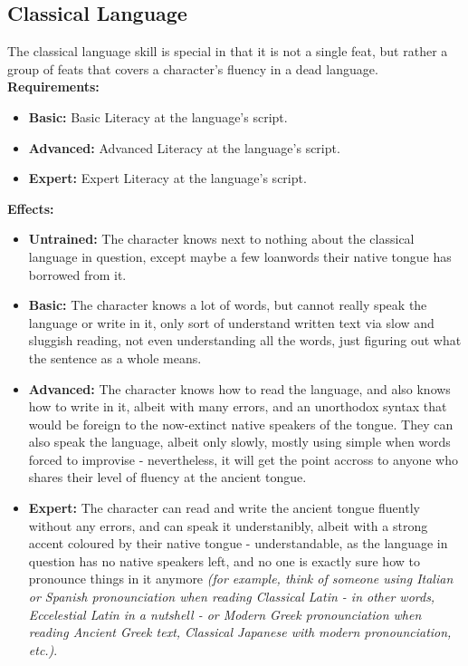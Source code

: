 \documentclass[openany,10pt,a4paper]{book}
\begin{document}
\begin{itemize}
\begin{itemize}
\begin{itemize}
\begin{itemize}
\subsection{Classical Language}
The classical language skill is special in that it is not a single feat, but rather a group of feats that covers a character's fluency in a dead language.\newline
\textbf{Requirements:}
\begin{itemize}
	\item \textbf{Basic:} Basic Literacy at the language's script.
	\item \textbf{Advanced:} Advanced Literacy at the language's script.
	\item \textbf{Expert:} Expert Literacy at the language's script.
\end{itemize}
\textbf{Effects:}
\begin{itemize}
	\item \textbf{Untrained:} The character knows next to nothing about the classical language in question, except maybe a few loanwords their native tongue has borrowed from it.
	\item \textbf{Basic:} The character knows a lot of words, but cannot really speak the language or write in it, only sort of understand written text via slow and sluggish reading, not even understanding all the words, just figuring out what the sentence as a whole means.
	\item \textbf{Advanced:} The character knows how to read the language, and also knows how to write in it, albeit with many errors, and an unorthodox syntax that would be foreign to the now-extinct native speakers of the tongue. They can also speak the language, albeit only slowly, mostly using simple when words forced to improvise - nevertheless, it will get the point accross to anyone who shares their level of fluency at the ancient tongue.
	\item \textbf{Expert:} The character can read and write the ancient tongue fluently without any errors, and can speak it understanibly, albeit with a strong accent coloured by their native tongue - understandable, as the language in question has no native speakers left, and no one is exactly sure how to pronounce things in it anymore \textit{(for example, think of someone using Italian or Spanish pronounciation when reading Classical Latin - in other words, Eccelestial Latin in a nutshell - or Modern Greek pronounciation when reading Ancient Greek text, Classical Japanese with modern pronounciation, etc.)}.
\end{itemize}\newpage

\end{itemize}
\end{itemize}
\end{itemize}
\end{itemize}
\end{document}
